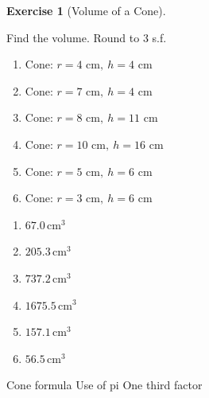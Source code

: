 \documentclass[
  letterpaper,
  DIV=11,
  numbers=noendperiod]{scrreprt}
\theoremstyle{definition}
\newtheorem{exercise}{Exercise}[chapter]
\theoremstyle{remark}
\begin{document}
\begin{exercise}[Volume of a
Cone]\protect\hypertarget{exr-cur-5}{}\label{exr-cur-5}

Find the volume. Round to 3 s.f.

\begin{enumerate}
\def\labelenumi{\alph{enumi})}
\item
  \(\text{Cone: }r=4\text{ cm},\ h=4\text{ cm}\)
\item
  \(\text{Cone: }r=7\text{ cm},\ h=4\text{ cm}\)
\item
  \(\text{Cone: }r=8\text{ cm},\ h=11\text{ cm}\)
\item
  \(\text{Cone: }r=10\text{ cm},\ h=16\text{ cm}\)
\item
  \(\text{Cone: }r=5\text{ cm},\ h=6\text{ cm}\)
\item
  \(\text{Cone: }r=3\text{ cm},\ h=6\text{ cm}\)
\end{enumerate}

\begin{tcolorbox}[enhanced jigsaw, opacitybacktitle=0.6, coltitle=black, arc=.35mm, colframe=quarto-callout-tip-color-frame, colback=white, bottomrule=.15mm, left=2mm, colbacktitle=quarto-callout-tip-color!10!white, titlerule=0mm, opacityback=0, title=\textcolor{quarto-callout-tip-color}{\faLightbulb}\hspace{0.5em}{🔍 View Solution}, leftrule=.75mm, breakable, rightrule=.15mm, bottomtitle=1mm, toptitle=1mm, toprule=.15mm]

\begin{enumerate}
\def\labelenumi{\alph{enumi})}
\item
  \(67.0\,\text{cm}^{3}\)
\item
  \(205.3\,\text{cm}^{3}\)
\item
  \(737.2\,\text{cm}^{3}\)
\item
  \(1675.5\,\text{cm}^{3}\)
\item
  \(157.1\,\text{cm}^{3}\)
\item
  \(56.5\,\text{cm}^{3}\)
\end{enumerate}

\end{tcolorbox}

{Cone formula} {Use of pi} {One third factor}

\end{exercise}
\end{document}
